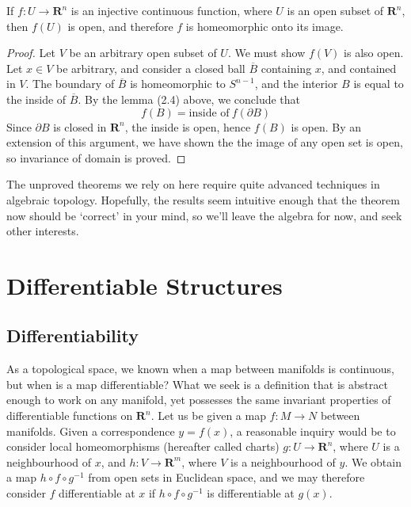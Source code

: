 \begin{theorem}
    If $f:U \to \mathbf{R}^n$ is an injective continuous function, where $U$ is an open subset of $\mathbf{R}^n$, then $f(U)$ is open, and therefore $f$ is homeomorphic onto its image.
\end{theorem}
\begin{proof}
    Let $V$ be an arbitrary open subset of $U$. We must show $f(V)$ is also open. Let $x \in V$ be arbitrary, and consider a closed ball $\overline{B}$ containing $x$, and contained in $V$. The boundary of $\overline{B}$ is homeomorphic to $S^{n-1}$, and the interior $B$ is equal to the inside of $\overline{B}$. By the lemma (2.4) above, we conclude that
    \[ f(B) = \text{inside of}\ f(\partial B) \]
    Since $\partial B$ is closed in $\mathbf{R}^n$, the inside is open, hence $f(B)$ is open. By an extension of this argument, we have shown the the image of any open set is open, so invariance of domain is proved.
\end{proof}

The unproved theorems we rely on here require quite advanced techniques in algebraic topology. Hopefully, the results seem intuitive enough that the theorem now should be `correct' in your mind, so we'll leave the algebra for now, and seek other interests.










\chapter{Differentiable Structures}

\section{Differentiability}

As a topological space, we known when a map between manifolds is continuous, but when is a map differentiable? What we seek is a definition that is abstract enough to work on any manifold, yet possesses the same invariant properties of differentiable functions on $\mathbf{R}^n$. Let us be given a map $f:M \to N$ between manifolds. Given a correspondence $y = f(x)$, a reasonable inquiry would be to consider local homeomorphisms (hereafter called charts) $g:U \to \mathbf{R}^n$, where $U$ is a neighbourhood of $x$, and $h:V \to \mathbf{R}^m$, where $V$ is a neighbourhood of $y$. We obtain a map $h \circ f \circ g^{-1}$ from open sets in Euclidean space, and we may therefore consider $f$ differentiable at $x$ if $h \circ f \circ g^{-1}$ is differentiable at $g(x)$.

